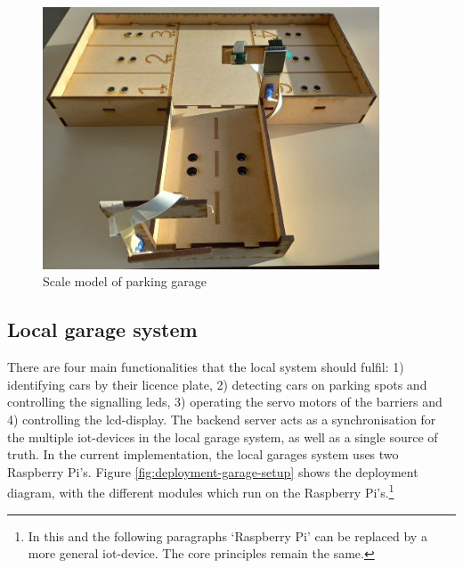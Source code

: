 \begin{figure}[H]
    \centering
    \includegraphics[width=10cm]{images/parking_garage.jpg}
    \caption{Scale model of parking garage}
    \label{fig:parking-garage}
\end{figure}



\subsection{Local garage system}\label{sec:implementation-on-site-system}
There are four main functionalities that the local system should fulfil: 1) identifying cars by their licence plate, 2) detecting cars on parking spots and controlling the signalling \acp{led}, 3) operating the servo motors of the barriers and 4) controlling the \ac{lcd}-display. The backend server acts as a synchronisation for the multiple \ac{iot}-devices in the local garage system, as well as a single source of truth. In the current implementation, the local garages system uses two Raspberry Pi's. Figure \ref{fig:deployment-garage-setup} shows the deployment diagram, with the different modules which run on the Raspberry Pi's.\footnote{In this and the following paragraphs `Raspberry Pi' can be replaced by a more general \ac{iot}-device. The core principles remain the same.}

